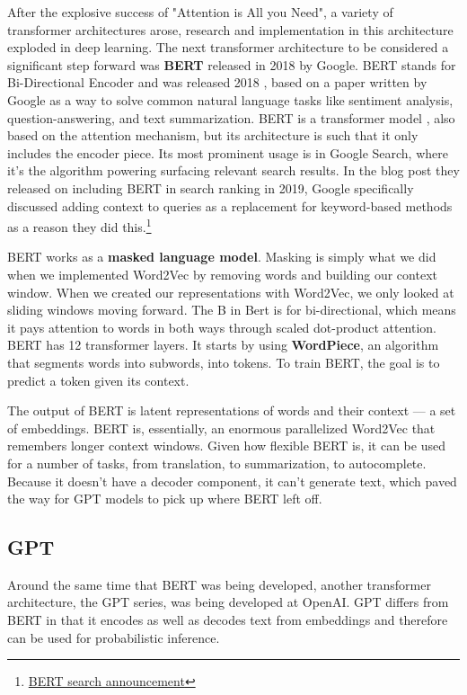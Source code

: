 \documentclass[11pt, table]{diazessay} %
\begin{document}
\begin{sloppypar}
After the explosive success of "Attention is All you Need", a variety of transformer architectures arose, research and implementation in this architecture exploded in deep learning. The next transformer architecture to be considered a significant step forward was \textbf{BERT} released in 2018 by Google.
BERT stands for Bi-Directional Encoder and was released 2018 \citep{devlin2018bert}, based on a paper written by Google as a way to solve common natural language tasks like sentiment analysis, question-answering, and text summarization. BERT is a transformer model , also based on the attention mechanism, but its architecture is such that it only includes the encoder piece. Its most prominent usage is in Google Search, where it's the algorithm powering surfacing relevant search results. In the blog post they released on including BERT in search ranking in 2019, Google specifically discussed adding context to queries as a replacement for keyword-based methods as a reason they did this.\footnote{\href{https://blog.google/products/search/search-language-understanding-bert/}{BERT search announcement}}

BERT works as a \textbf{masked language model}. Masking is simply what we did when we implemented Word2Vec by removing words and building our context window. When we created our representations with Word2Vec, we only looked at sliding windows moving forward. The B in Bert is for bi-directional, which means it pays attention to words in both ways through scaled dot-product attention. BERT has 12 transformer layers. It starts by using \textbf{WordPiece}, an algorithm that segments words into subwords, into tokens. To train BERT, the goal is to predict a token given its context.

The output of BERT is latent representations of words and their context --- a set of embeddings. BERT is, essentially, an enormous parallelized Word2Vec that remembers longer context windows.  Given how flexible BERT is, it can be used for a number of tasks, from translation, to summarization, to autocomplete. Because it doesn't have a decoder component, it can't generate text, which paved the way for GPT models to pick up where BERT left off.


\subsection{GPT}
Around the same time that BERT was being developed, another transformer architecture, the GPT series, was being developed at OpenAI. GPT differs from BERT in that it encodes as well as decodes text from embeddings and therefore can be used for probabilistic inference.


\end{sloppypar}
\end{document}
